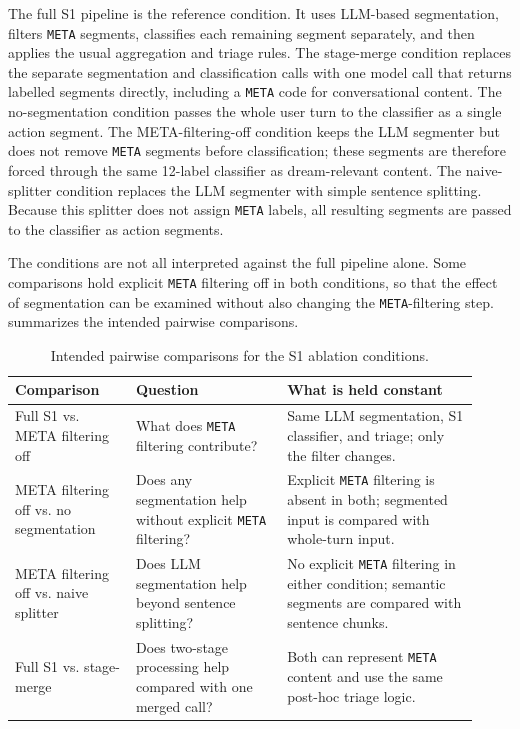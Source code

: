 The full S1 pipeline is the reference condition. It uses LLM-based segmentation, filters
\texttt{META} segments, classifies each remaining segment separately, and then applies
the usual aggregation and triage rules. The stage-merge condition replaces the separate
segmentation and classification calls with one model call that returns labelled
segments directly, including a \texttt{META} code for conversational content. The
no-segmentation condition passes the whole user turn to the classifier as a single
action segment. The META-filtering-off condition keeps the LLM segmenter but does not
remove \texttt{META} segments before classification; these segments are therefore
forced through the same 12-label classifier as dream-relevant content. The
naive-splitter condition replaces the LLM segmenter with simple sentence splitting.
Because this splitter does not assign \texttt{META} labels, all resulting segments are
passed to the classifier as action segments.

The conditions are not all interpreted against the full pipeline alone. Some comparisons
hold explicit \texttt{META} filtering off in both conditions, so that the effect of
segmentation can be examined without also changing the \texttt{META}-filtering step.
 summarizes the intended pairwise
comparisons.

\begin{table}[!htbp]
  \centering
  \caption{Intended pairwise comparisons for the S1 ablation conditions.}
  \label{tab:ablation-condition-interpretation}
  \scriptsize
  \setlength{\tabcolsep}{3pt}
  \renewcommand{\arraystretch}{1.12}
  \begin{tabular}{@{}>{\raggedright\arraybackslash}p{0.24\linewidth}>{\raggedright\arraybackslash}p{0.30\linewidth}>{\raggedright\arraybackslash}p{0.38\linewidth}@{}}
    \toprule
    Comparison & Question & What is held constant \\
    \midrule
    Full S1 vs. META filtering off & What does \texttt{META} filtering contribute? & Same LLM segmentation, S1 classifier, and triage; only the filter changes. \\
    \addlinespace[0.2em]
    META filtering off vs. no segmentation & Does any segmentation help without explicit \texttt{META} filtering? & Explicit \texttt{META} filtering is absent in both; segmented input is compared with whole-turn input. \\
    \addlinespace[0.2em]
    META filtering off vs. naive splitter & Does LLM segmentation help beyond sentence splitting? & No explicit \texttt{META} filtering in either condition; semantic segments are compared with sentence chunks. \\
    \addlinespace[0.2em]
    Full S1 vs. stage-merge & Does two-stage processing help compared with one merged call? & Both can represent \texttt{META} content and use the same post-hoc triage logic. \\
    \bottomrule
  \end{tabular}
\end{table}

